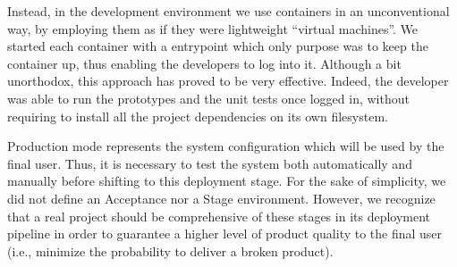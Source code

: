 Instead, in the development environment we use containers in an unconventional
way, by employing them as if they were lightweight ``virtual machines''.
We started each container with a entrypoint which
only purpose was to keep the container up, thus enabling the developers to log into it.
Although a bit unorthodox, this approach has proved to be very effective.
Indeed, the developer was able to run the prototypes and the unit tests once
logged in, without requiring to install all the project dependencies on its
own filesystem.


Production mode represents the system configuration which will be used by the final user. Thus, it is necessary
to test the system both automatically and manually before shifting to this deployment stage. For the sake of
simplicity, we did not define an Acceptance nor a Stage environment. However,
we recognize that a real project should be comprehensive of these
stages in its deployment pipeline in order to guarantee a higher level of
product quality to the final user (i.e., minimize the probability to deliver a
broken product).

